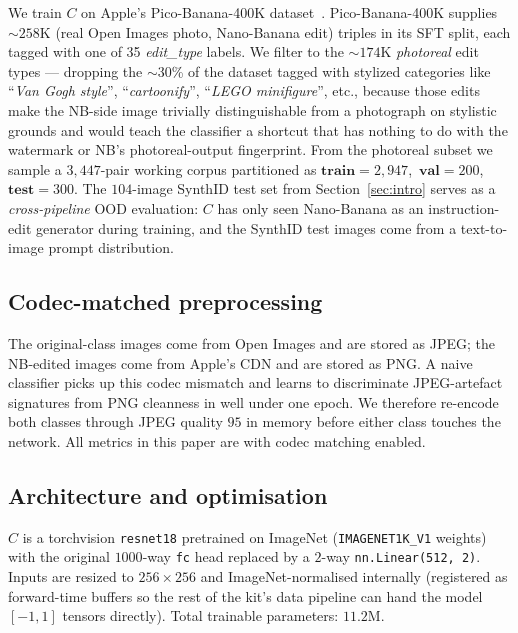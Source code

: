 \documentclass[11pt]{article}
\begin{document}
We train $C$ on Apple's Pico-Banana-400K
dataset~\citep{pico-banana-400k}. Pico-Banana-400K supplies $\sim$$258$K
(real Open Images photo, Nano-Banana edit) triples in its SFT split,
each tagged with one of 35 \emph{edit\_type} labels. We filter to the
$\sim$$174$K \emph{photoreal} edit types --- dropping the $\sim$30\% of
the dataset tagged with stylized categories like
``\textit{Van Gogh style}'', ``\textit{cartoonify}'', ``\textit{LEGO
minifigure}'', etc., because those edits make the NB-side image trivially
distinguishable from a photograph on stylistic grounds and would teach
the classifier a shortcut that has nothing to do with the watermark or
NB's photoreal-output fingerprint. From the photoreal subset we sample
a $3{,}447$-pair working corpus partitioned as
$\textbf{train}{=}2{,}947$,~$\textbf{val}{=}200$, $\textbf{test}{=}300$.
The $104$-image SynthID test set from Section~\ref{sec:intro} serves as a
\emph{cross-pipeline} OOD evaluation: $C$ has only seen Nano-Banana
as an instruction-edit generator during training, and the SynthID test
images come from a text-to-image prompt distribution.

\subsection{Codec-matched preprocessing}

The original-class images come from Open Images and are stored as JPEG;
the NB-edited images come from Apple's CDN and are stored as PNG. A
naive classifier picks up this codec mismatch and learns to discriminate
JPEG-artefact signatures from PNG cleanness in well under one epoch.
We therefore re-encode both classes through JPEG quality $95$ in memory
before either class touches the network. All metrics in this paper are
with codec matching enabled.

\subsection{Architecture and optimisation}

$C$ is a torchvision \texttt{resnet18} pretrained on ImageNet
(\texttt{IMAGENET1K\_V1} weights)~\citep{he2016resnet} with the original
$1000$-way \texttt{fc} head replaced by a $2$-way
\texttt{nn.Linear(512,~2)}. Inputs are resized to $256{\times}256$ and
ImageNet-normalised internally (registered as forward-time buffers so
the rest of the kit's data pipeline can hand the model $[-1, 1]$
tensors directly). Total trainable parameters: $11.2$M.
\end{document}
